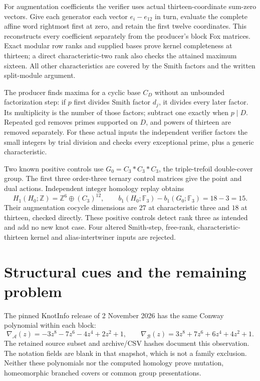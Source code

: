 \documentclass[11pt]{article}
\newcommand{\F}{\mathbb F}
\begin{document}
For augmentation coefficients the verifier uses actual
thirteen-coordinate sum-zero vectors. Give each generator
each vector $e_i-e_{12}$ in turn, evaluate the complete affine
word rightmost first at zero, and retain the first twelve
coordinates. This reconstructs every coefficient separately
from the producer's block Fox matrices. Exact modular row
ranks and supplied bases prove kernel completeness at
thirteen; a direct characteristic-two rank also checks the
attained maximum sixteen. All other characteristics are
covered by the Smith factors and the written split-module
argument.

The producer finds maxima for a cyclic base $C_D$ without
an unbounded factorization step: if $p$ first divides Smith
factor $d_j$, it divides every later factor. Its multiplicity
is the number of those factors; subtract one exactly when
$p\mid D$. Repeated gcd removes primes supported on $D$,
and powers of thirteen are removed separately. For these
actual inputs the independent verifier factors the small
integers by trial division and checks every exceptional
prime, plus a generic characteristic.

Two known positive controls use
$G_0=C_3*C_3*C_3$, the triple-trefoil double-cover group.
The first three order-three ternary control matrices give
the point and dual actions. Independent integer homology
replay obtains
\[
 H_1(H_0;\mathbb Z)=\mathbb Z^6\oplus(C_3)^{12},\qquad
 b_1(H_0;\F_3)-b_1(G_0;\F_3)=18-3=15.
\]
Their augmentation cocycle dimensions are $27$ at
characteristic three and $18$ at thirteen, checked directly.
These positive controls detect rank three as intended and
add no new knot case. Four altered Smith-step, free-rank,
characteristic-thirteen kernel and alias-intertwiner inputs
are rejected.

\section{Structural cues and the remaining problem}

The pinned KnotInfo release of 2 November 2026 has the same
Conway polynomial within each block:
\[
 \nabla_{\mathcal A}(z)=-3z^8-7z^6-4z^4+2z^2+1,
 \qquad
 \nabla_{\mathcal B}(z)=3z^8+7z^6+6z^4+4z^2+1.
\]
The retained source subset and archive/CSV hashes document
this observation. The notation fields are blank in that
snapshot, which is not a family exclusion. Neither these
polynomials nor the computed homology prove mutation,
homeomorphic branched covers or common group presentations.
\end{document}
